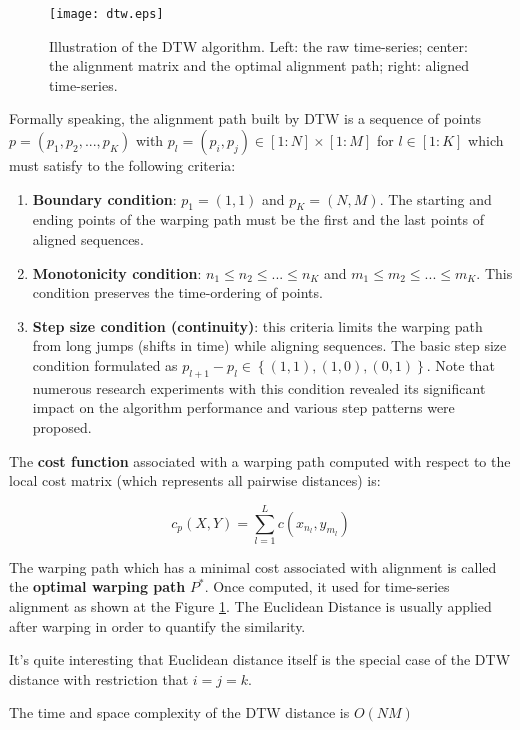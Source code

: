 \begin{figure}[tbp]
   \centering
   \texttt{[image: dtw.eps]}
   \caption{Illustration of the DTW algorithm. Left: the raw time-series; center: the alignment matrix and the optimal alignment path; right: aligned time-series.}
   \label{fig:dtw}
\end{figure} 

Formally speaking, the alignment path built by DTW is a sequence of points $p=(p_{1}, p_{2}, ... , p_{K})$ with $p_{l} = (p_{i}, p_{j}) \in [1:N] \times [1:M]$ for $l \in [1:K]$ which must satisfy to the following criteria:
\begin{enumerate}
	\item \textbf{Boundary condition}: $p_{1}=(1,1)$ and $p_{K}=(N,M)$. The starting and ending points of the warping path must be the first and the last points of aligned sequences.
	\item \textbf{Monotonicity condition}: $n_{1} \leq n_{2} \leq ... \leq n_{K}$ and $m_{1} \leq m_{2} \leq ... \leq m_{K}$. This condition preserves the time-ordering of points.
	\item \textbf{Step size condition (continuity)}: this criteria limits the warping path from long jumps (shifts in time) while aligning sequences. The basic step size condition formulated as $p_{l+1}-p_{l} \in \left\{ (1,1), (1,0), (0,1) \right\}$. Note that numerous research \cite{citeulike:3496861} \cite{citeulike:3578001} \cite{citeulike:603020} \cite{citeulike:3577984} experiments with this condition revealed its significant impact on the algorithm performance and various step patterns were proposed.
\end{enumerate}

The \textbf{cost function} associated with a warping path computed with respect to the local cost matrix (which represents all pairwise distances) is: 

\begin{equation}
\label{eq:pathcost}
c_{p}(X,Y) = \sum_{l=1}^{L} c(x_{n_{l}}, y_{m_{l}})
\end{equation}

The warping path which has a minimal cost associated with alignment is called the \textbf{optimal warping path} $P^{*}$. Once computed, it used for time-series alignment as shown at the Figure \ref{fig:dtw}. The Euclidean Distance is usually applied after warping in order to quantify the similarity.

It's quite interesting that Euclidean distance itself is the special case of the DTW distance with restriction that $i=j=k$.

The time and space complexity of the DTW distance is $O(NM)$
